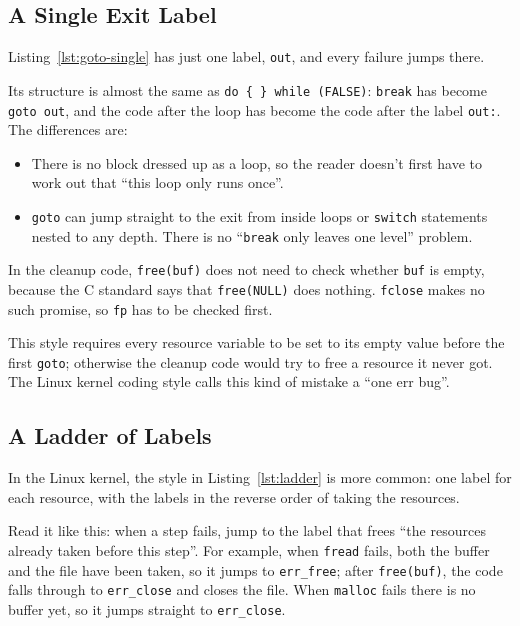 \subsection{A Single Exit Label}

Listing~\ref{lst:goto-single} has just one label, \texttt{out}, and every failure jumps there.


Its structure is almost the same as \texttt{do \{ \} while (FALSE)}: \texttt{break} has become \texttt{goto out}, and the code after the loop has become the code after the label \texttt{out:}. The differences are:
\begin{itemize}
  \item There is no block dressed up as a loop, so the reader doesn't first have to work out that ``this loop only runs once''.
  \item \texttt{goto} can jump straight to the exit from inside loops or \texttt{switch} statements nested to any depth. There is no ``\texttt{break} only leaves one level'' problem.
\end{itemize}

In the cleanup code, \texttt{free(buf)} does not need to check whether \texttt{buf} is empty, because the C standard says that \texttt{free(NULL)} does nothing. \texttt{fclose} makes no such promise, so \texttt{fp} has to be checked first.

This style requires every resource variable to be set to its empty value before the first \texttt{goto}; otherwise the cleanup code would try to free a resource it never got. The Linux kernel coding style calls this kind of mistake a ``one err bug''.

\subsection{A Ladder of Labels}

In the Linux kernel, the style in Listing~\ref{lst:ladder} is more common: one label for each resource, with the labels in the reverse order of taking the resources.


Read it like this: when a step fails, jump to the label that frees ``the resources already taken before this step''. For example, when \texttt{fread} fails, both the buffer and the file have been taken, so it jumps to \texttt{err\_free}; after \texttt{free(buf)}, the code falls through to \texttt{err\_close} and closes the file. When \texttt{malloc} fails there is no buffer yet, so it jumps straight to \texttt{err\_close}.

